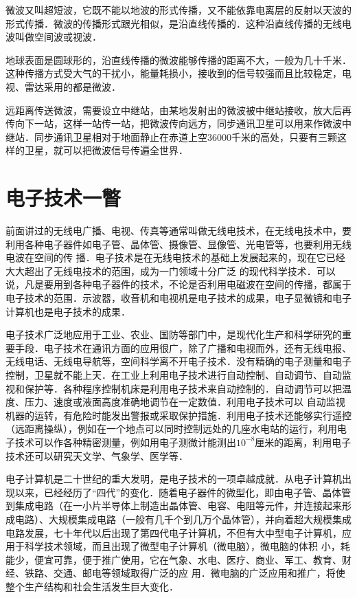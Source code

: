 微波又叫超短波，它既不能以地波的形式传播，又不能依靠电离层的反射以天波的形式传播．微波的传播形式跟光相似，是沿直线传播的．这种沿直线传播的无线电波叫做空间波或视波．

地球表面是圆球形的，沿直线传播的微波能够传播的距离不大，一般为几十千米．这种传播方式受大气的干扰小，能量耗损小，接收到的信号较强而且比较稳定，电视、雷达采用的都是微波．

远距离传送微波，需要设立中继站，由某地发射出的微波被中继站接收，放大后再传向下一站，这样一站传一站，把微波传向远方，同步通讯卫星可以用来作微波中继站．同步通讯卫星相对于地面静止在赤道上空36000千米的高处，只要有三颗这样的卫星，就可以把微波信号传遍全世界．

\section{电子技术一瞥}
前面讲过的无线电广播、电视、传真等通常叫做无线电技术，在无线电技术中，要利用各种电子器件如电子管、晶体管、摄像管、显像管、光电管等，也要利用无线电波在空间的传
播．电子技术是在无线电技术的基础上发展起来的，现在它已经大大超出了无线电技术的范围，成为一门领域十分广泛
的现代科学技术．可以说，凡是要用到各种电子器件的技术，不论是否利用电磁波在空间的传播，都属于电子技术的范围．示波器，收音机和电视机是电子技术的成果，电子显微镜和电子计算机也是电子技术的成果．

电子技术广泛地应用于工业、农业、国防等部门中，是现代化生产和科学研究的重要手段．电子技术在通讯方面的应用很广，除了广播和电视而外，还有无线电报、无线电话、无线电导航等，空间科学离不开电子技术．没有精确的电子测量和电子控制，卫星就不能上天．在工业上利用电子技术进行自动控制、自动调节、自动监视和保护等．各种程序控制机床是利用电子技术来自动控制的．自动调节可以把温度、压力、速度或液面高度准确地调节在一定数值．利用电子技术可以
自动监视机器的运转，有危险时能发出警报或采取保护措施．利用电子技术还能够实行遥控（远距离操纵），例如在一个地点可以同时控制远处的几座水电站的运行，利用电子技术可以作各种精密测量，例如用电子测微计能测出$10^{-8}$厘米的距离，利用电子技术还可以研究天文学、气象学、医学等．

电子计算机是二十世纪的重大发明，是电子技术的一项卓越成就．从电子计算机出现以来，已经经历了“四代”的变化．随着电子器件的微型化，即由电子管、晶体管到集成电路（在一小片半导体上制造出晶体管、电容、电阻等元件，并连接起来形成电路）、大规模集成电路（一般有几千个到几万个晶体管），并向着超大规模集成电路发展，七十年代以后出现了第四代电子计算机，不但有大中型电子计算机，应用于科学技术领域，而且出现了微型电子计算机（微电脑），微电脑的体积
小，耗能少，便宜可靠，便于推广使用，它在气象、水电、医疗、商业、军工、教育、财经、铁路、交通、邮电等领域取得广泛的应
用．微电脑的广泛应用和推广，将使整个生产结构和社会生活发生巨大变化．

